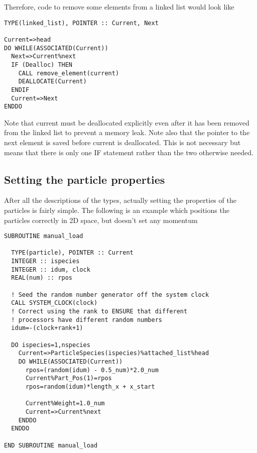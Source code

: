 \documentclass[12pt,a4paper]{article}
\newcommand{\simpleboxverbatim}{\begin{Verbatim}[obeytabs=true,frame=single,
  framerule=0.5mm,rulecolor=\color{warwickmid},formatcom=\color{black}]}
\begin{document}
Therefore, code to remove some elements from a linked list would look like
\simpleboxverbatim
TYPE(linked_list), POINTER :: Current, Next

Current=>head
DO WHILE(ASSOCIATED(Current))
  Next=>Current%next
  IF (Dealloc) THEN
    CALL remove_element(current)
    DEALLOCATE(Current)
  ENDIF
  Current=>Next
ENDDO
\end{Verbatim}
Note that current must be deallocated explicitly even after it has been
removed from the linked list to prevent a memory leak. Note also that the
pointer to the next element is saved before current is deallocated. This is
not necessary but means that there is only one IF statement rather than the
two otherwise needed.

\subsection{Setting the particle properties}
After all the descriptions of the types, actually setting the properties of
the particles is fairly simple. The following is an example which positions
the particles correctly in 2D space, but doesn't set any momentum

\simpleboxverbatim
SUBROUTINE manual_load

  TYPE(particle), POINTER :: Current
  INTEGER :: ispecies
  INTEGER :: idum, clock
  REAL(num) :: rpos

  ! Seed the random number generator off the system clock
  CALL SYSTEM_CLOCK(clock)
  ! Correct using the rank to ENSURE that different
  ! processors have different random numbers
  idum=-(clock+rank+1)

  DO ispecies=1,nspecies
    Current=>ParticleSpecies(ispecies)%
    DO WHILE(ASSOCIATED(Current))
      rpos=(random(idum) - 0.5_num)*2.0_num
      Current%
      rpos=random(idum)*length_x + x_start

      Current%
      Current=>Current%
    ENDDO
  ENDDO

END SUBROUTINE manual_load
\end{Verbatim}
\end{document}
